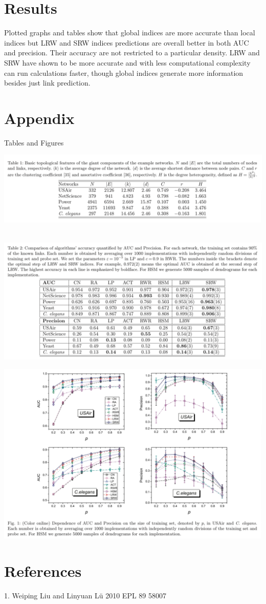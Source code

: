 \documentclass{article}
\begin{document}
\section{Results}
Plotted graphs and tables show that global indices are more accurate than local indices but LRW and SRW indices predictions are overall better in both AUC and precision. Their accuracy are not restricted to a particular density. LRW and SRW have shown to be more accurate and with less computational complexity can run calculations faster, though global indices generate more information besides just link prediction.

\section{Appendix}

Tables and Figures\par
\includegraphics[scale=0.35]{images/Table1.png}\par
\\


\includegraphics[scale=0.35]{images/Table2.png}

\includegraphics[scale=0.35]{images/Figure1.png}



\section{References}
1. Weiping Liu and Linyuan Lü 2010 EPL 89 58007
\end{document}
